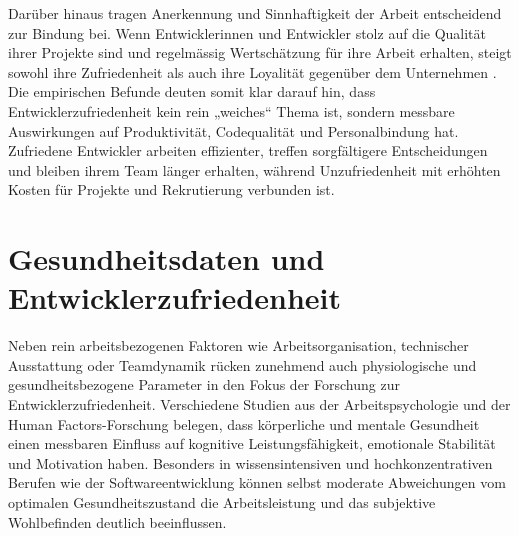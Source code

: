 \documentclass[12pt,a4paper]{report}
\begin{document}
Darüber hinaus tragen Anerkennung und Sinnhaftigkeit der Arbeit entscheidend zur Bindung bei. Wenn Entwicklerinnen und Entwickler
stolz auf die Qualität ihrer Projekte sind und regelmässig Wertschätzung für ihre Arbeit erhalten, steigt sowohl ihre Zufriedenheit
als auch ihre Loyalität gegenüber dem Unternehmen \cite{sadowski_happiness_2019,graziotin_what_2018}. Die empirischen Befunde deuten
somit klar darauf hin, dass Entwicklerzufriedenheit kein rein „weiches“ Thema ist, sondern messbare Auswirkungen auf Produktivität,
Codequalität und Personalbindung hat. Zufriedene Entwickler arbeiten effizienter, treffen sorgfältigere Entscheidungen und bleiben
ihrem Team länger erhalten, während Unzufriedenheit mit erhöhten Kosten für Projekte und Rekrutierung verbunden ist.

\section{Gesundheitsdaten und Entwicklerzufriedenheit}\label{stateoftheart-gesundheit}

Neben rein arbeitsbezogenen Faktoren wie Arbeitsorganisation, technischer Ausstattung oder Teamdynamik rücken zunehmend auch
physiologische und gesundheitsbezogene Parameter in den Fokus der Forschung zur Entwicklerzufriedenheit. Verschiedene Studien aus
der Arbeitspsychologie und der Human Factors-Forschung belegen, dass körperliche und mentale Gesundheit einen messbaren Einfluss
auf kognitive Leistungsfähigkeit, emotionale Stabilität und Motivation haben. Besonders in wissensintensiven und
hochkonzentrativen Berufen wie der Softwareentwicklung können selbst moderate Abweichungen vom optimalen Gesundheitszustand die
Arbeitsleistung und das subjektive Wohlbefinden deutlich beeinflussen.
\end{document}
